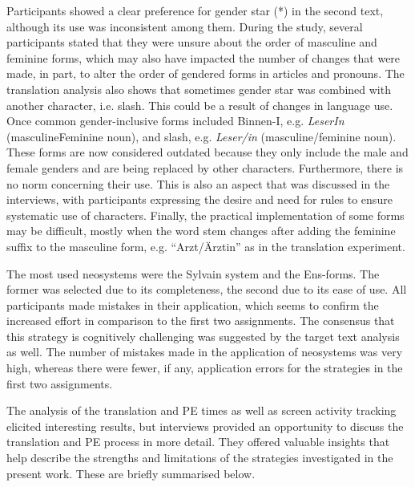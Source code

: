 Participants showed a clear preference for gender star (*) in the second text, although its use was inconsistent among them. During the study, several participants stated that they were unsure about the order of masculine and feminine forms, which may also have impacted the number of changes that were made, in part, to alter the order of gendered forms in articles and pronouns. The translation analysis also shows that sometimes gender star was combined with another character, i.e. slash. This could be a result of changes in language use. Once common gender-inclusive forms included Binnen-I, e.g. \textit{LeserIn} (masculineFeminine noun), and slash, e.g. \textit{Leser/in} (masculine/feminine noun). These forms are now considered outdated because they only include the male and female genders and are being replaced by other characters. Furthermore, there is no norm concerning their use. This is also an aspect that was discussed in the interviews, with participants expressing the desire and need for rules to ensure systematic use of characters. Finally, the practical implementation of some forms may be difficult, mostly when the word stem changes after adding the feminine suffix to the masculine form, e.g. ``Arzt/Ärztin'' as in the translation experiment. 

The most used neosystems were the Sylvain system and the Ens-forms. The former was selected due to its completeness, the second due to its ease of use. All participants made mistakes in their application, which seems to confirm the increased effort in comparison to the first two assignments. The consensus that this strategy is cognitively challenging was suggested by the target text analysis as well. The number of mistakes made in the application of neosystems was very high, whereas there were fewer, if any, application errors for the strategies in the first two assignments.

The analysis of the translation and PE times as well as screen activity tracking elicited interesting results, but interviews provided an opportunity to discuss the translation and PE process in more detail. They offered valuable insights that help describe the strengths and limitations of the strategies investigated in the present work. These are briefly summarised below.

